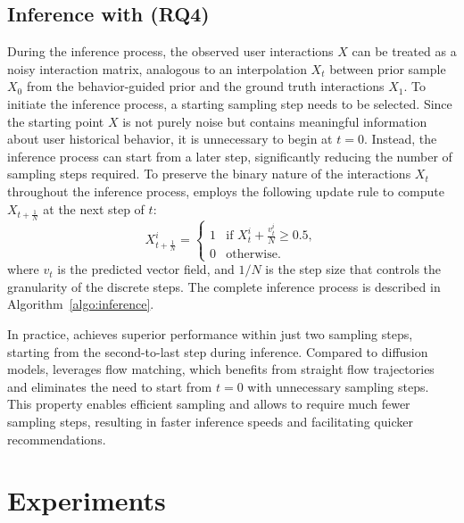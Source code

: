 \documentclass[sigconf]{acmart}
\begin{document}
\subsection{Inference with \ours (RQ4)}
During the inference process, the observed user interactions $X$ can be treated as a noisy interaction matrix, analogous to an interpolation $X_t$ between prior sample $X_0$ from the behavior-guided prior and the ground truth interactions $X_1$. To initiate the inference process, a starting sampling step needs to be selected. Since the starting point $X$ is not purely noise but contains meaningful information about user historical behavior, it is unnecessary to begin at $t = 0$. Instead, the inference process can start from a later step, significantly reducing the number of sampling steps required.
To preserve the binary nature of the interactions $X_t$ throughout the inference process, \ours employs the following update rule to compute $X_{t+\frac{1}{N}}$ at the next step of $t$:
\begin{equation}
\label{eq:update_xt}
X_{t+\frac{1}{N}}^i= 
\begin{cases}
1 & \text{if } X_t^i + \frac{v_t^i}{N} \geq 0.5, \\
0 & \text{otherwise}.
\end{cases}
\end{equation}
where $v_t$ is the predicted vector field, and $1/N$ is the step size that controls the granularity of the discrete steps. 
The complete inference process is described in Algorithm~\ref{algo:inference}.


In practice, \ours achieves superior performance within just two sampling steps, starting from the second-to-last step during inference. Compared to diffusion models, \ours leverages flow matching, which benefits from straight flow trajectories and eliminates the need to start from $t=0$ with unnecessary sampling steps. This property enables efficient sampling and allows \ours to require much fewer sampling steps, resulting in faster inference speeds and facilitating quicker recommendations.



\section{Experiments}
\end{document}
